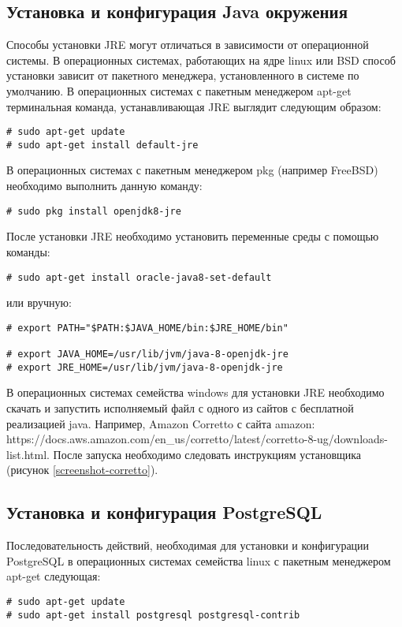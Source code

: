 \subsection{Установка и конфигурация Java окружения}

Способы установки JRE могут отличаться в зависимости от операционной системы. В операционных системах, работающих на ядре linux или BSD способ установки зависит от пакетного менеджера, установленного в системе по умолчанию.
В операционных системах с пакетным менеджером apt-get терминальная команда, устанавливающая JRE выглядит следующим образом:
\begin{lstlisting}
# sudo apt-get update
# sudo apt-get install default-jre
\end{lstlisting}

В операционных системах с пакетным менеджером pkg (например FreeBSD) необходимо выполнить данную команду:
\begin{lstlisting}
# sudo pkg install openjdk8-jre
\end{lstlisting}
После установки JRE необходимо установить переменные среды с помощью команды:
\begin{lstlisting}
# sudo apt-get install oracle-java8-set-default
\end{lstlisting}
или вручную:
\begin{lstlisting}
# export PATH="$PATH:$JAVA_HOME/bin:$JRE_HOME/bin"

# export JAVA_HOME=/usr/lib/jvm/java-8-openjdk-jre
# export JRE_HOME=/usr/lib/jvm/java-8-openjdk-jre
\end{lstlisting}

В операционных системах семейства windows для установки JRE необходимо скачать и запустить исполняемый файл с одного из сайтов с бесплатной реализацией java.
Например, Amazon Corretto с сайта amazon: https://docs.aws.amazon.com/en_us/corretto/latest/corretto-8-ug/downloads-list.html.
После запуска необходимо следовать инструкциям установщика (рисунок \ref{screenshot-corretto}).

\subsection{Установка и конфигурация PostgreSQL}

Последовательность действий, необходимая для установки и конфигурации PostgreSQL в операционных системах семейства linux с пакетным менеджером apt-get следующая:
\begin{lstlisting}
# sudo apt-get update
# sudo apt-get install postgresql postgresql-contrib
\end{lstlisting}

